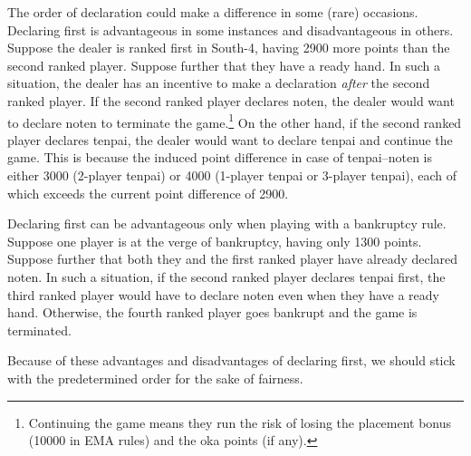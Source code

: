 \bigskip
The order of declaration could make a difference in some (rare) occasions. Declaring first is advantageous in some instances and disadvantageous in others. Suppose the dealer is ranked first in South-4, having 2900 more points than the second ranked player. Suppose further that they have a ready hand. In such a situation, the dealer has an incentive to make a declaration \emph{after} the second ranked player. If the second ranked player declares {\jap noten}, the dealer would want to declare {\jap noten} to terminate the game.\footnote{Continuing the game means they run the risk of losing the placement bonus (10000 in EMA rules) and the {\jap oka} points (if any).} On the other hand, if the second ranked player declares {\jap tenpai}, the dealer would want to declare {\jap tenpai} and continue the game. This is because the induced point difference in case of {\jap tenpai}--{\jap noten} is either 3000 (2-player {\jap tenpai}) or 4000 (1-player {\jap tenpai} or 3-player {\jap tenpai}), each of which exceeds the current point difference of 2900. 

\bigskip
Declaring first can be advantageous only when playing with a bankruptcy rule. Suppose one player is at the verge of bankruptcy, having only 1300 points. Suppose further that both they and the first ranked player have already declared {\jap noten}. 
In such a situation, if the second ranked player declares {\jap tenpai} first, the third ranked player would have to declare {\jap noten} even when they have a ready hand. Otherwise, the fourth ranked player goes bankrupt and the game is terminated.

\bigskip
Because of these advantages and disadvantages of declaring first, we should stick with the predetermined order for the sake of fairness. 

\newpage


